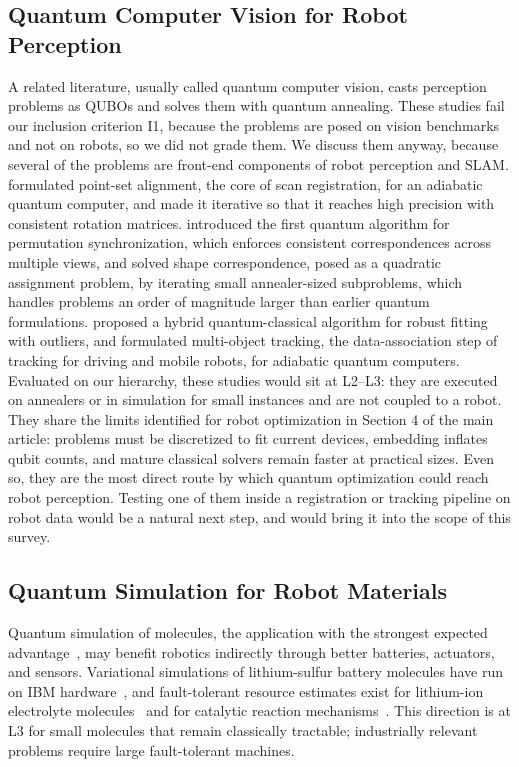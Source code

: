 \documentclass[acmsmall,screen,review]{acmart}
\begin{document}
\subsection*{Quantum Computer Vision for Robot Perception}
A related literature, usually called quantum computer vision, casts perception problems as QUBOs and solves them with quantum annealing. These studies fail our inclusion criterion I1, because the problems are posed on vision benchmarks and not on robots, so we did not grade them. We discuss them anyway, because several of the problems are front-end components of robot perception and SLAM. \citet{Golyanik2020} formulated point-set alignment, the core of scan registration, for an adiabatic quantum computer, and \citet{Meli2022} made it iterative so that it reaches high precision with consistent rotation matrices. \citet{Birdal2021} introduced the first quantum algorithm for permutation synchronization, which enforces consistent correspondences across multiple views, and \citet{Benkner2021} solved shape correspondence, posed as a quadratic assignment problem, by iterating small annealer-sized subproblems, which handles problems an order of magnitude larger than earlier quantum formulations. \citet{Doan2022} proposed a hybrid quantum-classical algorithm for robust fitting with outliers, and \citet{Zaech2022} formulated multi-object tracking, the data-association step of tracking for driving and mobile robots, for adiabatic quantum computers. Evaluated on our hierarchy, these studies would sit at L2--L3: they are executed on annealers or in simulation for small instances and are not coupled to a robot. They share the limits identified for robot optimization in Section 4 of the main article: problems must be discretized to fit current devices, embedding inflates qubit counts, and mature classical solvers remain faster at practical sizes. Even so, they are the most direct route by which quantum optimization could reach robot perception. Testing one of them inside a registration or tracking pipeline on robot data would be a natural next step, and would bring it into the scope of this survey.


\subsection*{Quantum Simulation for Robot Materials}
Quantum simulation of molecules, the application with the strongest expected advantage~\cite{McArdle2020,Bauer2020}, may benefit robotics indirectly through better batteries, actuators, and sensors. Variational simulations of lithium-sulfur battery molecules have run on IBM hardware~\cite{Rice2021}, and fault-tolerant resource estimates exist for lithium-ion electrolyte molecules~\cite{Kim2022} and for catalytic reaction mechanisms~\cite{Reiher2017}. This direction is at L3 for small molecules that remain classically tractable; industrially relevant problems require large fault-tolerant machines.






\end{document}
